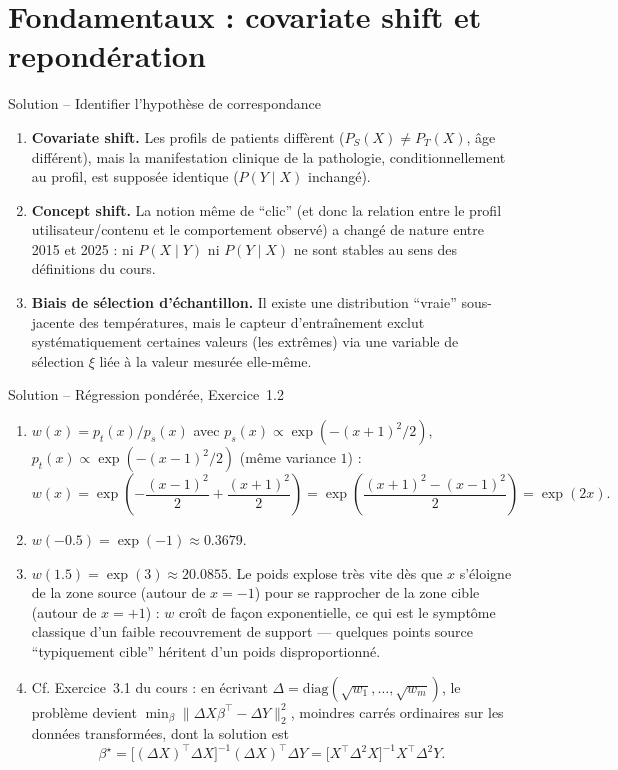 \documentclass[11pt]{article}
\begin{document}
\pagestyle{fancy}

\section{Fondamentaux : covariate shift et repondération}

\begin{exercisebox}{Solution -- Identifier l'hypothèse de correspondance}
\begin{enumerate}[label=(\alph*)]
\item \textbf{Covariate shift.} Les profils de patients diffèrent ($P_S(X)\neq P_T(X)$, âge différent),
mais la manifestation clinique de la pathologie, conditionnellement au profil, est supposée identique
($P(Y\mid X)$ inchangé).
\item \textbf{Concept shift.} La notion même de \enquote{clic} (et donc la relation entre le profil
utilisateur/contenu et le comportement observé) a changé de nature entre 2015 et 2025 : ni $P(X\mid Y)$
ni $P(Y\mid X)$ ne sont stables au sens des définitions du cours.
\item \textbf{Biais de sélection d'échantillon.} Il existe une distribution \enquote{vraie} sous-jacente
des températures, mais le capteur d'entraînement exclut systématiquement certaines valeurs (les
extrêmes) via une variable de sélection $\xi$ liée à la valeur mesurée elle-même.
\end{enumerate}
\end{exercisebox}

\begin{exercisebox}{Solution -- Régression pondérée, Exercice~1.2}
\begin{enumerate}[label=(\alph*)]
\item $w(x) = p_t(x)/p_s(x)$ avec $p_s(x)\propto \exp(-(x+1)^2/2)$, $p_t(x)\propto\exp(-(x-1)^2/2)$
(même variance $1$) :
\[
w(x) = \exp\!\left(-\frac{(x-1)^2}{2}+\frac{(x+1)^2}{2}\right) = \exp\!\left(\frac{(x+1)^2-(x-1)^2}{2}\right)
= \exp(2x).
\]
\item $w(-0.5) = \exp(-1) \approx 0.3679$.
\item $w(1.5) = \exp(3) \approx 20.0855$. Le poids explose très vite dès que $x$ s'éloigne de la zone
source (autour de $x=-1$) pour se rapprocher de la zone cible (autour de $x=+1$) : $w$ croît de façon
exponentielle, ce qui est le symptôme classique d'un faible recouvrement de support --- quelques points
source \enquote{typiquement cible} héritent d'un poids disproportionné.
\item Cf. Exercice~3.1 du cours : en écrivant $\Delta=\mathrm{diag}(\sqrt{w_1},\ldots,\sqrt{w_m})$, le
problème devient $\min_\beta \|\Delta X\beta^\top - \Delta Y\|_2^2$, moindres carrés ordinaires sur les
données transformées, dont la solution est
\[
\beta^\star = \big[(\Delta X)^\top \Delta X\big]^{-1}(\Delta X)^\top \Delta Y = \big[X^\top \Delta^2
X\big]^{-1} X^\top \Delta^2 Y.
\]
\end{enumerate}
\end{exercisebox}
\end{document}

